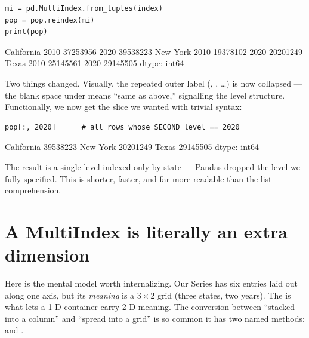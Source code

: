 \documentclass[11pt]{article}
\begin{document}
\begin{lstlisting}
mi = pd.MultiIndex.from_tuples(index)
pop = pop.reindex(mi)
print(pop)
\end{lstlisting}

\begin{outblock}
California  2010    37253956
            2020    39538223
New York    2010    19378102
            2020    20201249
Texas       2010    25145561
            2020    29145505
dtype: int64
\end{outblock}

Two things changed. Visually, the repeated outer label (, , \dots) is now collapsed --- the blank space under  means ``same as above,'' signalling the level structure. Functionally, we now get the slice we wanted with trivial syntax:

\begin{lstlisting}
pop[:, 2020]      # all rows whose SECOND level == 2020
\end{lstlisting}

\begin{outblock}
California    39538223
New York      20201249
Texas         29145505
dtype: int64
\end{outblock}

The result is a single-level  indexed only by state --- Pandas dropped the level we fully specified. This is shorter, faster, and far more readable than the list comprehension.

\section{A MultiIndex is literally an extra dimension}

Here is the mental model worth internalizing. Our  Series has six entries laid out along one axis, but its \emph{meaning} is a $3 \times 2$ grid (three states, two years). The  is what lets a 1-D container carry 2-D meaning. The conversion between ``stacked into a column'' and ``spread into a grid'' is so common it has two named methods:  and .
\end{document}
